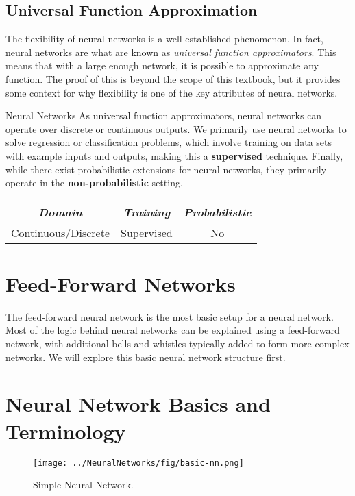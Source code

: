\subsection{Universal Function Approximation}
The flexibility of neural networks is a well-established phenomenon. In fact, neural networks are what are known as \textit{universal function approximators}. This means that with a large enough network, it is possible to approximate any function. The proof of this is beyond the scope of this textbook, but it provides some context for why flexibility is one of the key attributes of neural networks.

\begin{mlcube}{Neural Networks}
As universal function approximators, neural networks can operate over discrete or continuous outputs. We primarily use neural networks to solve regression or classification problems, which involve training on data sets with example inputs and outputs, making this a \textbf{supervised} technique. Finally, while there exist probabilistic extensions for neural networks, they primarily operate in the \textbf{non-probabilistic} setting.
\begin{center}
    \begin{tabular}{c|c|c}
    \textit{\textbf{Domain}} & \textit{\textbf{Training}} & \textit{\textbf{Probabilistic}} \\
    \hline
    Continuous/Discrete & Supervised & No \\
    \end{tabular}
\end{center}
\end{mlcube}

\section{Feed-Forward Networks}
The feed-forward neural network is the most basic setup for a neural network. Most of the logic behind neural networks can be explained using a feed-forward network, with additional bells and whistles typically added to form more complex networks. We will explore this basic neural network structure first.

\section{Neural Network Basics and Terminology}

\begin{figure}
    \centering
    \texttt{[image: ../NeuralNetworks/fig/basic-nn.png]}
    \caption{Simple Neural Network.}
    \label{fig:basic-nn}
\end{figure}

